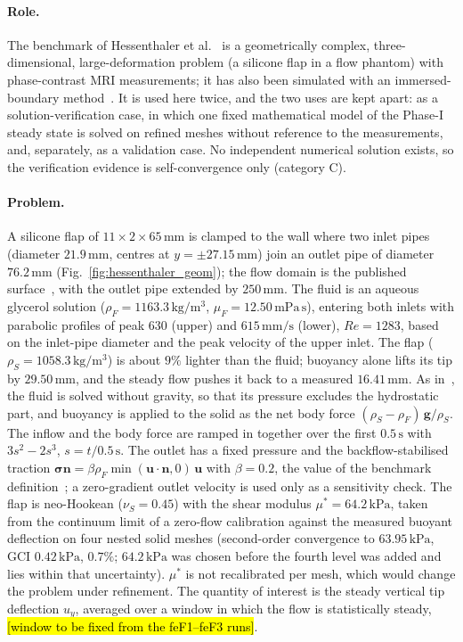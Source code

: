 \paragraph{Role.}
The benchmark of Hessenthaler et al.~\citep{Hessenthaler2017a,Hessenthaler2017b} is a geometrically complex, three-dimensional, large-deformation problem (a silicone flap in a flow phantom) with phase-contrast MRI measurements; it has also been simulated with an immersed-boundary method~\citep{Kolahdouz2023}.
It is used here twice, and the two uses are kept apart: as a solution-verification case, in which one fixed mathematical model of the Phase-I steady state is solved on refined meshes without reference to the measurements, and, separately, as a validation case.
No independent numerical solution exists, so the verification evidence is self-convergence only (category C).

\paragraph{Problem.}
A silicone flap of $11 \times 2 \times 65\,\mathrm{mm}$ is clamped to the wall where two inlet pipes (diameter $21.9\,\mathrm{mm}$, centres at $y = \pm27.15\,\mathrm{mm}$) join an outlet pipe of diameter $76.2\,\mathrm{mm}$ (Fig.~\ref{fig:hessenthaler_geom}); the flow domain is the published surface~\citep{Hessenthaler2017a}, with the outlet pipe extended by $250\,\mathrm{mm}$.
The fluid is an aqueous glycerol solution ($\rho_F = 1163.3\,\mathrm{kg/m^3}$, $\mu_F = 12.50\,\mathrm{mPa\,s}$), entering both inlets with parabolic profiles of peak $630$ (upper) and $615\,\mathrm{mm/s}$ (lower), $Re = 1283$, based on the inlet-pipe diameter and the peak velocity of the upper inlet.
The flap ($\rho_S = 1058.3\,\mathrm{kg/m^3}$) is about $9\%$ lighter than the fluid; buoyancy alone lifts its tip by $29.50\,\mathrm{mm}$, and the steady flow pushes it back to a measured $16.41\,\mathrm{mm}$.
As in~\citep{Hessenthaler2017b}, the fluid is solved without gravity, so that its pressure excludes the hydrostatic part, and buoyancy is applied to the solid as the net body force $(\rho_S - \rho_F)\,\mathbf{g}/\rho_S$. The inflow and the body force are ramped in together over the first $0.5\,\mathrm{s}$ with $3s^2 - 2s^3$, $s = t/0.5\,\mathrm{s}$.
The outlet has a fixed pressure and the backflow-stabilised traction $\boldsymbol{\sigma}\mathbf{n} = \beta \rho_F \min(\mathbf{u}\cdot\mathbf{n}, 0)\,\mathbf{u}$ with $\beta = 0.2$, the value of the benchmark definition~\citep{Hessenthaler2017b,EsmailyMoghadam2011}; a zero-gradient outlet velocity is used only as a sensitivity check.
The flap is neo-Hookean ($\nu_S = 0.45$) with the shear modulus $\mu^* = 64.2\,\mathrm{kPa}$, taken from the continuum limit of a zero-flow calibration against the measured buoyant deflection on four nested solid meshes (second-order convergence to $63.95\,\mathrm{kPa}$, GCI $0.42\,\mathrm{kPa}$, $0.7\%$; $64.2\,\mathrm{kPa}$ was chosen before the fourth level was added and lies within that uncertainty). $\mu^*$ is not recalibrated per mesh, which would change the problem under refinement.
The quantity of interest is the steady vertical tip deflection $u_y$, averaged over a window in which the flow is statistically steady, \hl{[window to be fixed from the feF1--feF3 runs]}.

